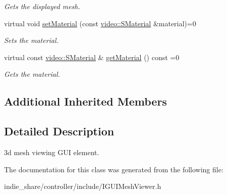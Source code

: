 \begin{DoxyCompactItemize}
\begin{DoxyCompactList}\small\item\em Gets the displayed mesh. \end{DoxyCompactList}\item 
\mbox{\label{classirr_1_1gui_1_1IGUIMeshViewer_ad840a26c63cf8b3442f61a058a7c2281}} 
virtual void \hyperlink{classirr_1_1gui_1_1IGUIMeshViewer_ad840a26c63cf8b3442f61a058a7c2281}{set\+Material} (const \hyperlink{classirr_1_1video_1_1SMaterial}{video\+::\+S\+Material} \&material)=0
\begin{DoxyCompactList}\small\item\em Sets the material. \end{DoxyCompactList}\item 
\mbox{\label{classirr_1_1gui_1_1IGUIMeshViewer_a22fefc9c5255e1896c16e72edb7cd373}} 
virtual const \hyperlink{classirr_1_1video_1_1SMaterial}{video\+::\+S\+Material} \& \hyperlink{classirr_1_1gui_1_1IGUIMeshViewer_a22fefc9c5255e1896c16e72edb7cd373}{get\+Material} () const =0
\begin{DoxyCompactList}\small\item\em Gets the material. \end{DoxyCompactList}\end{DoxyCompactItemize}
\subsection*{Additional Inherited Members}


\subsection{Detailed Description}
3d mesh viewing G\+UI element. 

The documentation for this class was generated from the following file\+:\begin{DoxyCompactItemize}
\item 
indie\+\_\+share/controller/include/I\+G\+U\+I\+Mesh\+Viewer.\+h\end{DoxyCompactItemize}
